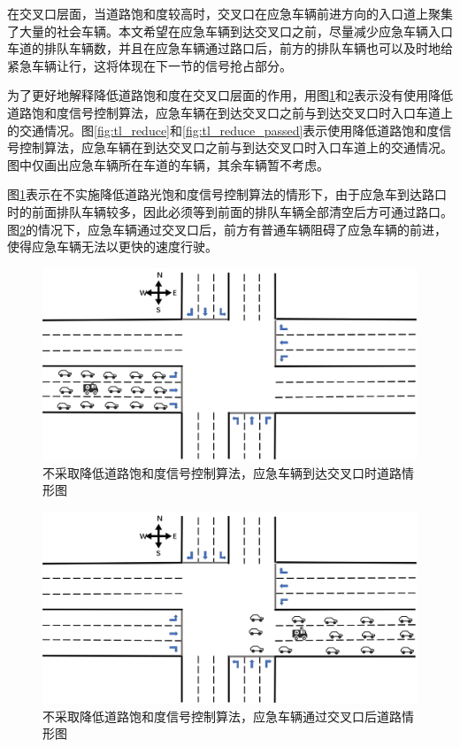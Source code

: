 在交叉口层面，当道路饱和度较高时，交叉口在应急车辆前进方向的入口道上聚集了大量的社会车辆。本文希望在应急车辆到达交叉口之前，尽量减少应急车辆入口车道的排队车辆数，并且在应急车辆通过路口后，前方的排队车辆也可以及时地给紧急车辆让行，这将体现在下一节的信号抢占部分。

为了更好地解释降低道路饱和度在交叉口层面的作用，用图\ref{fig:tl_unreduce}和\ref{fig:tl_unreduce_passed}表示没有使用降低道路饱和度信号控制算法，应急车辆在到达交叉口之前与到达交叉口时入口车道上的交通情况。图\ref{fig:tl_reduce}和\ref{fig:tl_reduce_passed}表示使用降低道路饱和度信号控制算法，应急车辆在到达交叉口之前与到达交叉口时入口车道上的交通情况。图中仅画出应急车辆所在车道的车辆，其余车辆暂不考虑。


图\ref{fig:tl_unreduce}表示在不实施降低道路光饱和度信号控制算法的情形下，由于应急车到达路口时的前面排队车辆较多，因此必须等到前面的排队车辆全部清空后方可通过路口。图\ref{fig:tl_unreduce_passed}的情况下，应急车辆通过交叉口后，前方有普通车辆阻碍了应急车辆的前进，使得应急车辆无法以更快的速度行驶。

\begin{figure}[H]
	\centering
	\includegraphics[width=\textwidth]{figures/tl_unreduce.png}
	\caption{不采取降低道路饱和度信号控制算法，应急车辆到达交叉口时道路情形图}
	\label{fig:tl_unreduce}
\end{figure}

\begin{figure}[H]
	\centering
	\includegraphics[width=\textwidth]{figures/tl_unreduce_passed.png}
	\caption{不采取降低道路饱和度信号控制算法，应急车辆通过交叉口后道路情形图}
	\label{fig:tl_unreduce_passed}
\end{figure}

